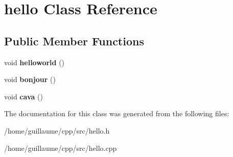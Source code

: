 \hypertarget{classhello}{}\section{hello Class Reference}
\label{classhello}
\subsection*{Public Member Functions}
\begin{DoxyCompactItemize}
\item 
\mbox{\label{classhello_aa57d2579e9414955795896d10397c910}} 
void {\bfseries helloworld} ()
\item 
\mbox{\label{classhello_a499d8fc624dd2cb66ffd66877b0dea52}} 
void {\bfseries bonjour} ()
\item 
\mbox{\label{classhello_a92957333d0410388c997f6fe0b57b9e3}} 
void {\bfseries cava} ()
\end{DoxyCompactItemize}


The documentation for this class was generated from the following files\+:\begin{DoxyCompactItemize}
\item 
/home/guillaume/cpp/src/hello.\+h\item 
/home/guillaume/cpp/src/hello.\+cpp\end{DoxyCompactItemize}
